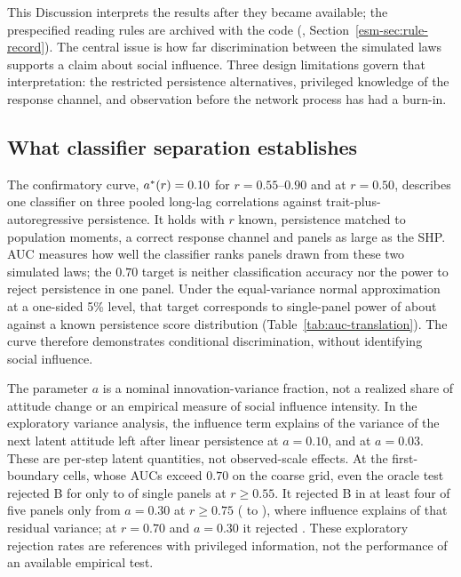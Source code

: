 This Discussion interprets the results after they became available; the prespecified reading rules are archived with the code (\esmresource, Section~\ref{esm-sec:rule-record}). The central issue is how far discrimination between the simulated laws supports a claim about social influence. Three design limitations govern that interpretation: the restricted persistence alternatives, privileged knowledge of the response channel, and observation before the network process has had a burn-in.

\subsection{What classifier separation establishes}\label{sec:disc-meaning}

The confirmatory curve, $a^*(r)=\resultnum{j.b.r055.first.point}{0.10}$ for $r=0.55$--$0.90$ and  at $r=0.50$, describes one classifier on three pooled long-lag correlations against trait-plus-autoregressive persistence. It holds with $r$ known, persistence matched to population moments, a correct response channel and panels as large as the SHP. AUC measures how well the classifier ranks panels drawn from these two simulated laws; the $0.70$ target is neither classification accuracy nor the power to reject persistence in one panel. Under the equal-variance normal approximation at a one-sided 5\% level, that target corresponds to single-panel power of about  against a known persistence score distribution (Table~\ref{tab:auc-translation}). The curve therefore demonstrates conditional discrimination, without identifying social influence.

The parameter $a$ is a nominal innovation-variance fraction, not a realized share of attitude change or an empirical measure of social influence intensity. In the exploratory variance analysis, the influence term explains  of the variance of the next latent attitude left after linear persistence at $a=0.10$, and  at $a=0.03$. These are per-step latent quantities, not observed-scale effects. At the first-boundary cells, whose AUCs exceed $0.70$ on the coarse grid, even the oracle test rejected B for only  to  of single panels at $r\ge0.55$. It rejected B in at least four of five panels only from $a=0.30$ at $r\ge0.75$ ( to ), where influence explains  of that residual variance; at $r=0.70$ and $a=0.30$ it rejected . These exploratory rejection rates are references with privileged information, not the performance of an available empirical test.


